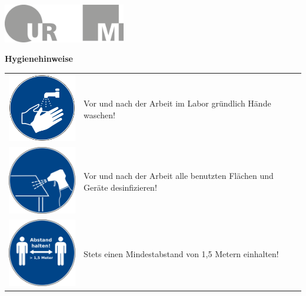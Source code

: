 \documentclass[24pt, a4paper, portrait]{article}
\begin{document}
\pagestyle{empty}

\raggedleft

\includegraphics[width=0.4\textwidth]{logo}

\vspace{1cm}
\sffamily
\centering
\Huge

\textbf{Hygienehinweise}


\raggedright
\huge

\begin{tabular}{ m{4.2cm} m{11.5cm} }
    \includegraphics[width=4cm]{handhygiene} & Vor und nach der Arbeit im Labor gründlich Hände waschen! \\
    \vspace{2mm}
    \includegraphics[width=4cm]{desinfektion} & Vor und nach der Arbeit alle benutzten Flächen und Geräte desinfizieren! \\
    \vspace{2mm}
    \includegraphics[width=4cm]{abstand} & Stets einen Mindestabstand von 1,5 Metern einhalten! \\

\end{tabular}
\end{document}
